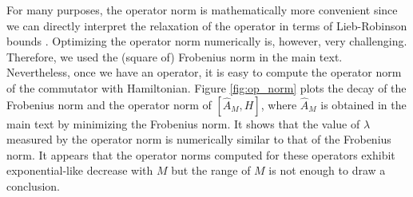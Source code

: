 \documentclass[twocolumn,superscriptaddress, prl,showpacs]{revtex4-1}
\begin{document}
For many purposes, the operator norm is mathematically more convenient
since we can directly interpret the relaxation of the operator in terms of Lieb-Robinson bounds \cite{Lieb:1972,Bravyi:2006}.
Optimizing the operator norm numerically is, however, very challenging. Therefore, we used the (square of) Frobenius norm in the main text.
Nevertheless, once we have an operator, it is easy to compute the operator norm of the commutator with Hamiltonian.
Figure \ref{fig:op_norm} plots the decay of the Frobenius norm and the operator norm of $[\hat{A}_M,H]$,
where $\hat{A}_M$ is obtained in the main text by minimizing the Frobenius norm.
It shows that the value of $\lambda$ measured by the operator norm is numerically similar to that of the Frobenius norm.
It appears that the operator norms computed for these operators exhibit exponential-like decrease with $M$ but
the range of $M$ is not enough to draw a conclusion.
\end{document}
